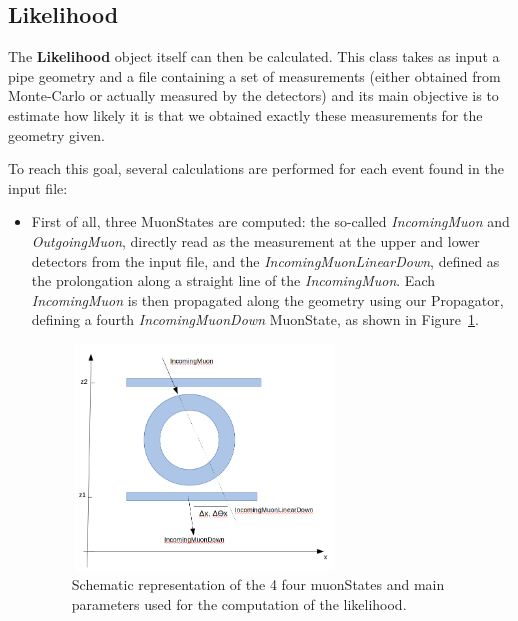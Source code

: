 \documentclass[a4paper, 11pt]{report}
\begin{document}
\subsection{Likelihood}

The \textbf{Likelihood} object itself can then be calculated. This class takes as input a pipe geometry and a file containing a set of measurements (either obtained from Monte-Carlo or actually measured by the detectors) and its main objective is to estimate how likely it is that we obtained exactly these measurements for the geometry given. 

To reach this goal, several calculations are performed for each event found in the input file: 
\begin{itemize}
\item First of all, three MuonStates are computed: the so-called \textit{IncomingMuon} and \textit{OutgoingMuon}, directly read as the measurement at the upper and lower detectors from the input file, and the \textit{IncomingMuonLinearDown}, defined as the prolongation along a straight line of the \textit{IncomingMuon}. Each \textit{IncomingMuon} is then propagated along the geometry using our Propagator, defining a fourth \textit{IncomingMuonDown} MuonState, as shown in Figure~\ref{fig:parameters}.

\begin{figure}[htbp]
\centering
\begin{minipage}[b]{.49\textwidth}
\includegraphics[width=7cm, height=6cm]{figs/parameters.png}
\end{minipage}\hfill
\caption{Schematic representation of the 4 four muonStates and main parameters used for the computation of the likelihood.}
\label{fig:parameters}
\end{figure}


\end{itemize}
\end{document}
